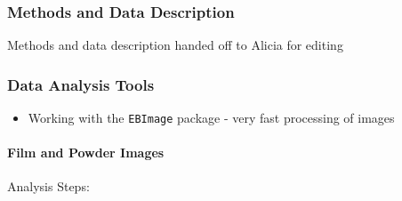 \documentclass[]{book}
\providecommand{\tightlist}{%
  \setlength{\itemsep}{0pt}\setlength{\parskip}{0pt}}
\let\oldparagraph\paragraph
\renewcommand{\paragraph}[1]{\oldparagraph{#1}\mbox{}}
\begin{document}
\hypertarget{lss-paper-methods}{%
\subsubsection*{Methods and Data Description}\label{lss-paper-methods}}

Methods and data description handed off to Alicia for editing

\hypertarget{lss-paper-analysis}{%
\subsubsection*{Data Analysis Tools}\label{lss-paper-analysis}}

\begin{itemize}
\tightlist
\item
  Working with the \texttt{EBImage} package - very fast processing of images
\end{itemize}

\hypertarget{lss-paper-analysis-film}{%
\paragraph{Film and Powder Images}\label{lss-paper-analysis-film}}

Analysis Steps:
\end{document}
